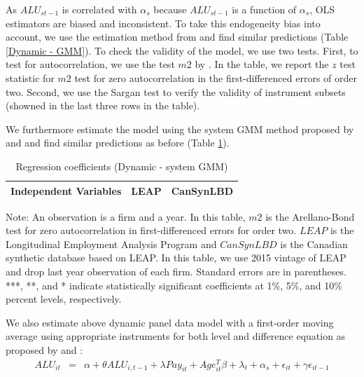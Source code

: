 \documentclass{article}
\begin{document}
As $ALU_{st-1}$ is correlated with $\alpha_{s}$ because $ALU_{st-1}$ is a function of $\alpha_{s}$, OLS estimators are biased and inconsistent. 
To take this endogeneity bias into account, we use the estimation method from \textcite{RePEc:oup:restud:v:58:y:1991:i:2:p:277-297.} and find similar predictions (Table \ref{Dynamic - GMM}). To check the validity of the model, we use two tests. First, to test for autocorrelation, we use the test $m2$ by \textcite{RePEc:oup:restud:v:58:y:1991:i:2:p:277-297.}. In the table, we report the $z$ test statistic for $m2$ test for zero autocorrelation in the  first-differenced errors of order two. Second, we use the Sargan test to verify the validity of instrument subsets (showned in the last three rows in the table).

We furthermore estimate the model using the system GMM  method proposed by \textcite{RePEc:eee:econom:v:68:y:1995:i:1:p:29-51} and \textcite{RePEc:eee:econom:v:87:y:1998:i:1:p:115-143} and find similar predictions as before (Table \ref{Dynamic - system GMM}). 

\begin{table}[H]
  \centering
\begin{threeparttable}
 \caption{Regression coefficients (Dynamic - system GMM)} \label{Dynamic - system GMM} \medskip
\renewcommand{\arraystretch}{1}
\begin{tabular}{l|c c| c c}
\toprule
\textbf{Independent Variables}&\multicolumn{2}{c|}{\textbf{LEAP}} &  \multicolumn{2}{c}{\textbf{CanSynLBD}}\\
\midrule

   \bottomrule
  \end{tabular} 
\begin{tablenotes}
\small
\item Note: An observation is a firm and a year. In this table, $m2$ is the Arellano-Bond test for zero autocorrelation in first-differenced errors for order two. $LEAP$ is the Longitudinal Employment Analysis Program and $CanSynLBD$ is the Canadian synthetic database based on LEAP. In this table, we use 2015 vintage of LEAP and drop last year observation of each firm. Standard errors are in parentheses. ***, **, and * indicate statistically significant coefficients at 1\%, 5\%, and 10\% percent levels, respectively.
 \end{tablenotes}
 \end{threeparttable}
\end{table}

We also estimate above dynamic panel data model with a first-order moving average using appropriate instruments for both level and difference equation as proposed by \textcite{RePEc:eee:econom:v:68:y:1995:i:1:p:29-51} and \textcite{RePEc:eee:econom:v:87:y:1998:i:1:p:115-143}:
\begin{eqnarray}	
ALU_{it}&=&\alpha +\theta ALU_{i,t-1}+\lambda Pay_{it}+Age_{it}^{T}\beta+\lambda_t+\alpha_s+\epsilon_{it}+\gamma\epsilon_{it-1}
\end{eqnarray}
\end{document}
